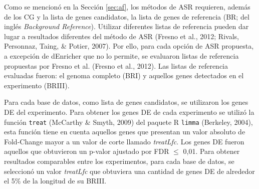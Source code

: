 \documentclass[12pt,twoside]{reedthesis}
\begin{document}
\par

Como se mencionó en la Sección \ref{sec:af}, los métodos de ASR requieren, además de los CG y la lista de genes candidatos, la lista de genes de referencia (BR; del inglés \emph{Background Reference}). Utilizar diferentes listas de referencia pueden dar lugar a resultados diferentes del método de ASR (Fresno et al., 2012; Rivals, Personnaz, Taing, \& Potier, 2007). Por ello, para cada opción de ASR propuesta, a excepción de dEnricher que no lo permite, se evaluaron listas de referencia propuestas por Fresno et al. (Fresno et al., 2012). Las listas de referencia evaluadas fueron: el genoma completo (BRI) y aquellos genes detectados en el experimento (BRIII).

\par

Para cada base de datos, como lista de genes candidatos, se utilizaron los genes DE del experimento. Para obtener los genes DE de cada experimento se utilizó la función \texttt{treat} (McCarthy \& Smyth, 2009) del paquete R \texttt{limma} (Berkeley, 2004), esta función tiene en cuenta aquellos genes que presentan un valor absoluto de Fold-Change mayor a un valor de corte llamado \emph{treatLfc}. Los genes DE fueron aquellos que obtuvieron un p-valor ajustado por FDR \(\leq\) 0,01. Para obtener resultados comparables entre los experimentos, para cada base de datos, se seleccionó un valor \emph{treatLfc} que obtuviera una cantidad de genes DE de alrededor el 5\% de la longitud de su BRIII.

\par
\end{document}
